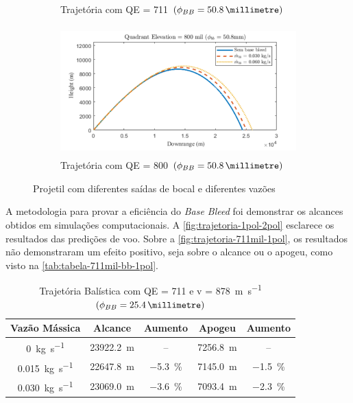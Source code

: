 \begin{figure}[!ht]
\begin{subfigure}[b]{0.47\textwidth}
        \caption{Trajetória com QE = \qty{711}{\milliradian} $\left(\phi_{BB} = \qty{50,8}{\millimetre}\right)$}
        \label{fig:trajetoria-711mil-2pol}
    \end{subfigure}
    \hfill
    \begin{subfigure}[b]{0.47\textwidth}
        \centering
        \includegraphics[height=5cm,width=\textwidth]{trajetoria_thallyo_wallace_basebleed-foto4.png}
        \caption{Trajetória com QE = \qty{800}{\milliradian} $\left(\phi_{BB} = \qty{50,8}{\millimetre}\right)$}
        \label{fig:trajetoria-800mil-2pol}
    \end{subfigure}
	\caption{Projetil com diferentes saídas de bocal e diferentes vazões}
	\label{fig:trajetoria-1pol-2pol}
\end{figure}

A metodologia para provar a eficiência do \textit{Base Bleed} foi demonstrar os alcances obtidos em simulações computacionais. A \autoref{fig:trajetoria-1pol-2pol} esclarece os resultados das predições de voo. Sobre a \autoref{fig:trajetoria-711mil-1pol}, os resultados não demonstraram um efeito positivo, seja sobre o alcance ou o apogeu, como visto na \autoref{tab:tabela-711mil-bb-1pol}. 

\begin{table}[ht]
\centering
\caption[Trajetória Balística com QE = \qty{711}{\milliradian} e v = \qty{878}{\metre\per\second} $\left(\phi_{BB} = \qty{25,4}{\millimetre}\right)$]{Trajetória Balística com QE = \qty{711}{\milliradian} e v = \qty{878}{\metre\per\second} $\left(\phi_{BB} = \qty{25,4}{\millimetre}\right)$}
\vspace{0.5cm}
\begin{tabular}{c|c|c|c|c}
Vazão Mássica & Alcance & Aumento & Apogeu & Aumento \\
\hline
\qty{0}{\kilogram\per\second} & \qty{23922,2}{\metre} & -- & \qty{7256,8}{\metre} & -- \\ 
\qty{0,015}{\kilogram\per\second} & \qty{22647,8}{\metre} & \qty{-5,3}{\percent} & \qty{7145,0}{\metre} & \qty{-1,5}{\percent} \\
\qty{0,030}{\kilogram\per\second} & \qty{23069,0}{\metre} & \qty{-3,6}{\percent} & \qty{7093,4}{\metre} & \qty{-2,3}{\percent}
\end{tabular}
\label{tab:tabela-711mil-bb-1pol}
\end{table}


